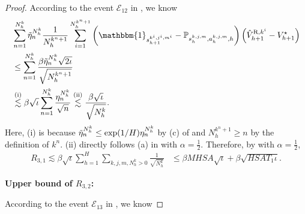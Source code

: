 \documentclass{article}
\newcommand{\R}{\textnormal{R}}
\begin{document}
\begin{proof}
According to the event $\mathcal{E}_{12}$ in , we know
\begin{align}
    \label{upperr31begin}
    &\sum_{n=1}^{N_h^k} \Tilde{\eta}_n^{N_h^k}\frac{1}{N_h^{k^n+1}} \sum_{i=1}^{N_h^{k^n+1}}\left(\mathbbm{1}_{s_{h+1}^{k^i,j^i,m^i}}-\mathbb{P}_{s_h^{k,j,m}, a_h^{k,j,m},h}\right)\left(\hat{V}_{h+1}^{\R,k^i}-V_{h+1}^{\star}\right) \nonumber\\
    &\leq \sum_{n=1}^{N_h^k} \frac{\beta\Tilde{\eta}_n^{N_h^k}\sqrt{2\iota}}{\sqrt{N_h^{k^n+1}}} \nonumber\\ &\overset{\mathrm{(i)}}{\lesssim} \beta\sqrt{\iota}\sum_{n=1}^{N_h^k} \frac{\eta_n^{N_h^k}}{\sqrt{n}} \overset{\mathrm{(ii)}}{\lesssim}  \frac{\beta\sqrt{\iota}}{\sqrt{N_h^k}}.
\end{align}
Here, (i) is because $\Tilde{\eta}_n^{N_h^k} \leq \exp(1/H)\eta_n^{N_h^k}$ by (c) of  and $N_h^{k^n+1} \geq n$ by the definition of $k^n$. (ii) directly follows (a) in  with $\alpha = \frac{1}{2}$. Therefore, by  with $\alpha = \frac{1}{2}$,
\begin{align}
    \label{upperr31}
    R_{3,1} \lesssim \beta\sqrt{\iota}\sum_{h=1}^H \sum_{k,j,m,N_h^k >0} \frac{1}{\sqrt{N_h^k}} 
    &\leq \beta MHSA\sqrt{\iota}+\beta\sqrt{HSAT_1\iota}.
\end{align}

\textbf{Upper bound of $R_{3,2}$:}

According to the event $\mathcal{E}_{13}$ in , we know


\end{proof}
\end{document}
